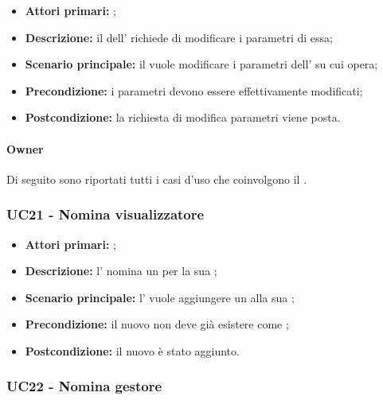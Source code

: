 \documentclass[../analisi-dei-requisiti]{subfiles}
\begin{document}
\begin{itemize}
\item \textbf{Attori primari:} ;
\item \textbf{Descrizione:} il  dell' richiede di modificare i parametri di essa;
\item \textbf{Scenario principale:} il  vuole modificare i parametri dell' su cui opera;
\item \textbf{Precondizione:} i parametri devono essere effettivamente modificati;
\item \textbf{Postcondizione:} la richiesta di modifica parametri viene posta.

\end{itemize}

\paragraph{Owner}
Di seguito sono riportati tutti i casi d'uso che coinvolgono il  .

\subsubsection{UC21 - Nomina visualizzatore}
\label{subsub:UC21}

\begin{itemize}
\item \textbf{Attori primari:} ;
\item \textbf{Descrizione:} l'  nomina un  per la sua ;
\item \textbf{Scenario principale:} l'  vuole aggiungere un  alla sua ;
\item \textbf{Precondizione:} il nuovo  non deve già esistere come ;
\item \textbf{Postcondizione:} il nuovo  è stato aggiunto.

\end{itemize}


\subsubsection{UC22 - Nomina gestore}
\label{subsub:UC22}
\end{document}
